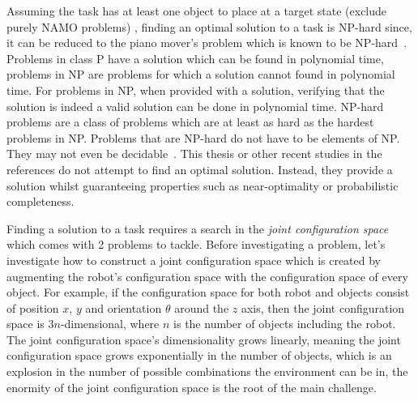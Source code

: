 Assuming the task has at least one object to place at a target state (exclude purely \ac{NAMO} problems) , finding an optimal solution to a task is \ac{NP-hard} since, it can be reduced to the piano mover's problem which is known to be \ac{NP-hard}~\cite{reif_motion_1985}.\\Problems in class P have a solution which can be found in polynomial time, problems in \ac{NP} are problems for which a solution cannot found in polynomial time. For problems in \ac{NP}, when provided with a solution, verifying that the solution is indeed a valid solution can be done in polynomial time. \ac{NP-hard} problems are a class of problems which are at least as hard as the hardest problems in \ac{NP}. Problems that are \ac{NP-hard} do not have to be elements of NP. They may not even be decidable~\cite{pokharel_computational_2020}. This thesis or other recent studies in the references do not attempt to find an optimal solution. Instead, they provide a solution whilst guaranteeing properties such as near-optimality or probabilistic completeness.\bs

Finding a solution to a task requires a search in the \textit{joint configuration space} which comes with 2 problems to tackle. Before investigating a problem, let's investigate how to construct a joint configuration space which is created by augmenting the robot's configuration space with the configuration space of every object. For example, if the configuration space for both robot and objects consist of position $x$, $y$ and orientation $\theta$ around the $z$ axis, then the joint configuration space is $3n$-dimensional, where $n$ is the number of objects including the robot. The joint configuration space's dimensionality grows linearly, meaning the joint configuration space grows exponentially in the number of objects, which is an explosion in the number of possible combinations the environment can be in, the enormity of the joint configuration space is the root of the main challenge.\bs

